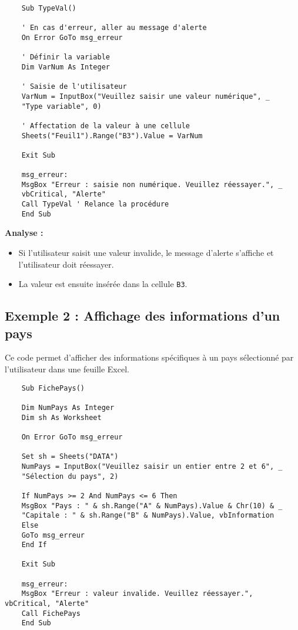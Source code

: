 \documentclass[a4paper,12pt]{report}
\begin{document}
\begin{lstlisting}
	Sub TypeVal()
	
	' En cas d'erreur, aller au message d'alerte
	On Error GoTo msg_erreur
	
	' Définir la variable
	Dim VarNum As Integer
	
	' Saisie de l'utilisateur
	VarNum = InputBox("Veuillez saisir une valeur numérique", _
	"Type variable", 0)
	
	' Affectation de la valeur à une cellule
	Sheets("Feuil1").Range("B3").Value = VarNum
	
	Exit Sub
	
	msg_erreur:
	MsgBox "Erreur : saisie non numérique. Veuillez réessayer.", _
	vbCritical, "Alerte"
	Call TypeVal ' Relance la procédure
	End Sub
\end{lstlisting}

\textbf{Analyse :}
\begin{itemize}
	\item Si l'utilisateur saisit une valeur invalide, le message d'alerte s'affiche et l'utilisateur doit réessayer.
	\item La valeur est ensuite insérée dans la cellule \texttt{B3}.
\end{itemize}

\subsection{Exemple 2 : Affichage des informations d'un pays}

Ce code permet d'afficher des informations spécifiques à un pays sélectionné par l'utilisateur dans une feuille Excel.

\begin{lstlisting}
	Sub FichePays()
	
	Dim NumPays As Integer
	Dim sh As Worksheet
	
	On Error GoTo msg_erreur
	
	Set sh = Sheets("DATA")
	NumPays = InputBox("Veuillez saisir un entier entre 2 et 6", _
	"Sélection du pays", 2)
	
	If NumPays >= 2 And NumPays <= 6 Then
	MsgBox "Pays : " & sh.Range("A" & NumPays).Value & Chr(10) & _
	"Capitale : " & sh.Range("B" & NumPays).Value, vbInformation
	Else
	GoTo msg_erreur
	End If
	
	Exit Sub
	
	msg_erreur:
	MsgBox "Erreur : valeur invalide. Veuillez réessayer.", vbCritical, "Alerte"
	Call FichePays
	End Sub
\end{lstlisting}
\end{document}

